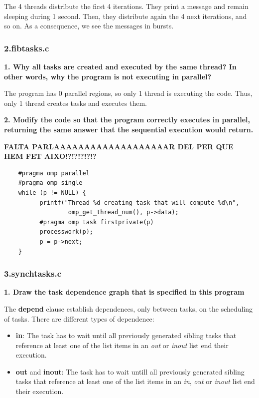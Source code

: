 \documentclass[12pt, a4paper]{article}
\begin{document}
The 4 threads distribute the first 4 iterations. They print a message and remain sleeping during 1 second. Then, they distribute again the 4 next iterations, and so on. As a consequence, we see the messages in bursts.

\subsubsection{2.fibtasks.c}

\textbf{1. Why all tasks are created and executed by the same thread? In other words, why the program is not executing in parallel?}

The program has 0 parallel regions, so only 1 thread is executing the code. Thus, only 1 thread creates tasks and executes them.

\hfill

\textbf{2. Modify the code so that the program correctly executes in parallel, returning the same answer that the sequential execution would return.}

\textbf{FALTA PARLAAAAAAAAAAAAAAAAAAAR DEL PER QUE HEM FET AIXO!?!?!?!?!?}

\begin{lstlisting}
	#pragma omp parallel
    #pragma omp single
    while (p != NULL) {
          printf("Thread %d creating task that will compute %d\n",
          		  omp_get_thread_num(), p->data);
          #pragma omp task firstprivate(p)
          processwork(p);
          p = p->next;
    }
\end{lstlisting}

\subsubsection{3.synchtasks.c}

\textbf{1. Draw the task dependence graph that is specified in this program}

The \textbf{depend} clause establish dependences, only between tasks, on the scheduling of tasks. There are different types of dependence:

\begin{itemize}
	\item \textbf{in}: The task has to wait until all previously generated sibling tasks that reference at least one of the list items in an \textit{out} or \textit{inout} list end their execution.
	\item \textbf{out} and \textbf{inout}: The task has to wait untill all previously generated sibling tasks that reference at least one of the list items in an \textit{in}, \textit{out} or \textit{inout} list end their execution.
\end{itemize}
\end{document}

